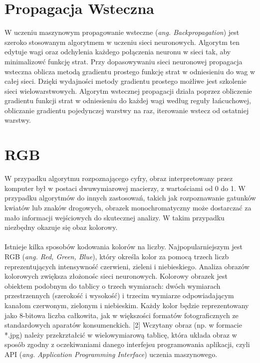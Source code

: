 \documentclass[openright]{xmgr}
\begin{document}
\section{Propagacja Wsteczna\label{s:dsssl}}

\indent \indent W uczeniu maszynowym propagowanie wsteczne (\textit{ang. Backpropagation}) jest szeroko stosowanym algorytmem w uczeniu sieci neuronowych. Algorytm ten edytuje wagi oraz odchylenia każdego połączenia neuronu w sieci tak, aby minimalizowć funkcję strat. Przy dopasowywaniu sieci neuronowej propagacja wsteczna oblicza metodą gradientu prostego funkcję strat w odniesieniu do wag w całej sieci. Dzięki wydajności metody gradientu prostego możliwe jest szkolenie sieci wielowarstwowych. Algorytm wstecznej propagacji działa poprzez obliczenie gradientu funkcji strat w odniesieniu do każdej wagi według reguły łańcuchowej, obliczanie gradientu pojedynczej warstwy na raz, iterowanie wstecz od ostatniej warstwy. 


 \section{RGB\label{s:dsssl}}
 
\indent \indent W przypadku algorytmu rozpoznającego cyfry, obraz interpretowany przez komputer był w postaci dwuwymiarowej macierzy, z wartościami od 0 do 1. W przypadku algorytmów do innych zastosowań, takich jak rozpoznawanie gatunków kwiatów lub znaków drogowych, obrazek monochromatyczny może dostarczać za mało informacji wejściowych do skutecznej analizy. W takim przypadku niezbędny okazuje się obaz kolorowy. 
\\ 
\\
\indent \indent Istnieje kilka sposobów kodowania kolorów na liczby. Najpopularniejszym jest
RGB (\textit{ang. Red, Green, Blue}), który określa kolor za pomocą trzech liczb reprezentujących intensywność czerwieni, zieleni i niebieskiego. Analiza obrazów kolorowych zwiększa złożonośc sieci neuronowych. Kolorowy obrazek jest obiektem podobnym do tablicy o trzech wymiarach: dwóch wymiarach przestrzennych (szerokość i wysokość) i trzecim wymiarze odpowiadającym kanałom czerwonym, zielonym i niebieskim. Każdy kolor będzie reprezentowany jako 8-bitowa liczba całkowita, jak w większości formatów fotograficznych ze standardowych aparatów konsumenckich. [2] Wczytany obraz (np. w formacie *.jpg) należy przekrztałcić w wielowymiarową tablicę, która układa obraz w sposób zgodny z oczekiwaniami danego interfejsu programowania aplikacji, czyli API (\textit{ang. Application Programming Interface}) uczenia maszynowego.
\end{document}
